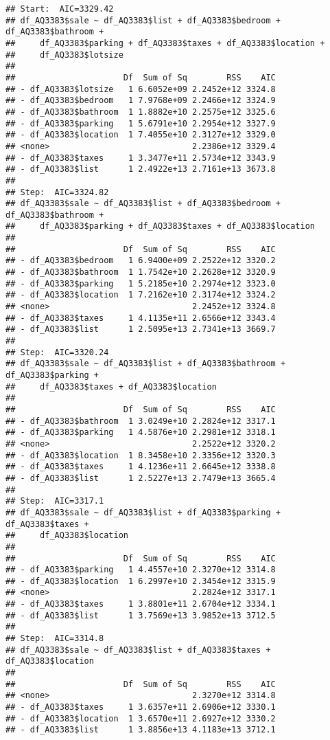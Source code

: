 \documentclass[
]{article}
\begin{document}
\begin{verbatim}
## Start:  AIC=3329.42
## df_AQ3383$sale ~ df_AQ3383$list + df_AQ3383$bedroom + df_AQ3383$bathroom + 
##     df_AQ3383$parking + df_AQ3383$taxes + df_AQ3383$location + 
##     df_AQ3383$lotsize
## 
##                      Df  Sum of Sq        RSS    AIC
## - df_AQ3383$lotsize   1 6.6052e+09 2.2452e+12 3324.8
## - df_AQ3383$bedroom   1 7.9768e+09 2.2466e+12 3324.9
## - df_AQ3383$bathroom  1 1.8882e+10 2.2575e+12 3325.6
## - df_AQ3383$parking   1 5.6791e+10 2.2954e+12 3327.9
## - df_AQ3383$location  1 7.4055e+10 2.3127e+12 3329.0
## <none>                             2.2386e+12 3329.4
## - df_AQ3383$taxes     1 3.3477e+11 2.5734e+12 3343.9
## - df_AQ3383$list      1 2.4922e+13 2.7161e+13 3673.8
## 
## Step:  AIC=3324.82
## df_AQ3383$sale ~ df_AQ3383$list + df_AQ3383$bedroom + df_AQ3383$bathroom + 
##     df_AQ3383$parking + df_AQ3383$taxes + df_AQ3383$location
## 
##                      Df  Sum of Sq        RSS    AIC
## - df_AQ3383$bedroom   1 6.9400e+09 2.2522e+12 3320.2
## - df_AQ3383$bathroom  1 1.7542e+10 2.2628e+12 3320.9
## - df_AQ3383$parking   1 5.2185e+10 2.2974e+12 3323.0
## - df_AQ3383$location  1 7.2162e+10 2.3174e+12 3324.2
## <none>                             2.2452e+12 3324.8
## - df_AQ3383$taxes     1 4.1135e+11 2.6566e+12 3343.4
## - df_AQ3383$list      1 2.5095e+13 2.7341e+13 3669.7
## 
## Step:  AIC=3320.24
## df_AQ3383$sale ~ df_AQ3383$list + df_AQ3383$bathroom + df_AQ3383$parking + 
##     df_AQ3383$taxes + df_AQ3383$location
## 
##                      Df  Sum of Sq        RSS    AIC
## - df_AQ3383$bathroom  1 3.0249e+10 2.2824e+12 3317.1
## - df_AQ3383$parking   1 4.5876e+10 2.2981e+12 3318.1
## <none>                             2.2522e+12 3320.2
## - df_AQ3383$location  1 8.3458e+10 2.3356e+12 3320.3
## - df_AQ3383$taxes     1 4.1236e+11 2.6645e+12 3338.8
## - df_AQ3383$list      1 2.5227e+13 2.7479e+13 3665.4
## 
## Step:  AIC=3317.1
## df_AQ3383$sale ~ df_AQ3383$list + df_AQ3383$parking + df_AQ3383$taxes + 
##     df_AQ3383$location
## 
##                      Df  Sum of Sq        RSS    AIC
## - df_AQ3383$parking   1 4.4557e+10 2.3270e+12 3314.8
## - df_AQ3383$location  1 6.2997e+10 2.3454e+12 3315.9
## <none>                             2.2824e+12 3317.1
## - df_AQ3383$taxes     1 3.8801e+11 2.6704e+12 3334.1
## - df_AQ3383$list      1 3.7569e+13 3.9852e+13 3712.5
## 
## Step:  AIC=3314.8
## df_AQ3383$sale ~ df_AQ3383$list + df_AQ3383$taxes + df_AQ3383$location
## 
##                      Df  Sum of Sq        RSS    AIC
## <none>                             2.3270e+12 3314.8
## - df_AQ3383$taxes     1 3.6357e+11 2.6906e+12 3330.1
## - df_AQ3383$location  1 3.6570e+11 2.6927e+12 3330.2
## - df_AQ3383$list      1 3.8856e+13 4.1183e+13 3712.1
\end{verbatim}
\end{document}
